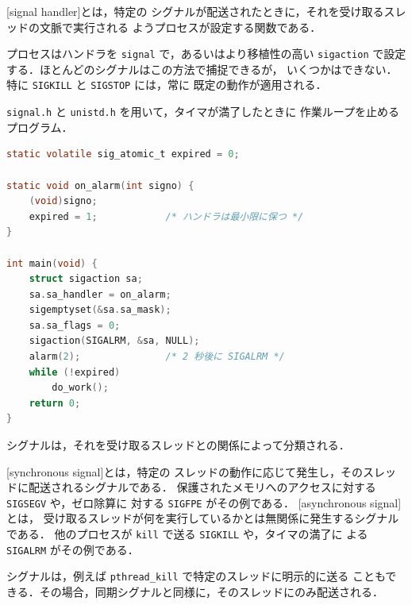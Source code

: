 \documentclass[../main.tex]{subfiles}
\begin{document}
\begin{definition}[シグナルハンドラ]
  [signal handler]とは，特定の
  シグナルが配送されたときに，それを受け取るスレッドの文脈で実行される
  ようプロセスが設定する関数である．
\end{definition}

プロセスはハンドラを \texttt{signal} で，あるいはより移植性の高い
\texttt{sigaction} で設定する．ほとんどのシグナルはこの方法で捕捉できるが，
いくつかはできない．特に \texttt{SIGKILL} と \texttt{SIGSTOP} には，常に
既定の動作が適用される．

\begin{example}
  \texttt{signal.h} と \texttt{unistd.h} を用いて，タイマが満了したときに
  作業ループを止めるプログラム．
  \begin{lstlisting}[language=C, numbers=none]
static volatile sig_atomic_t expired = 0;

static void on_alarm(int signo) {
    (void)signo;
    expired = 1;            /* ハンドラは最小限に保つ */
}

int main(void) {
    struct sigaction sa;
    sa.sa_handler = on_alarm;
    sigemptyset(&sa.sa_mask);
    sa.sa_flags = 0;
    sigaction(SIGALRM, &sa, NULL);
    alarm(2);               /* 2 秒後に SIGALRM */
    while (!expired)
        do_work();
    return 0;
}
\end{lstlisting}
\end{example}

シグナルは，それを受け取るスレッドとの関係によって分類される．

\begin{definition}[同期シグナルと非同期シグナル]
  [synchronous signal]とは，特定の
  スレッドの動作に応じて発生し，そのスレッドに配送されるシグナルである．
  保護されたメモリへのアクセスに対する \texttt{SIGSEGV} や，ゼロ除算に
  対する \texttt{SIGFPE} がその例である．
  [asynchronous signal]とは，
  受け取るスレッドが何を実行しているかとは無関係に発生するシグナルである．
  他のプロセスが \texttt{kill} で送る \texttt{SIGKILL} や，タイマの満了に
  よる \texttt{SIGALRM} がその例である．
\end{definition}

シグナルは，例えば \texttt{pthread\_kill} で特定のスレッドに明示的に送る
こともできる．その場合，同期シグナルと同様に，そのスレッドにのみ配送される．%
\end{document}
